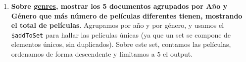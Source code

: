 \documentclass[a4paper,onecolumn]{article}
\begin{document}
\begin{sloppypar}
\begin{enumerate}
\begin{center}
\begin{figure}[h!]
        \end{figure}
    \end{center}
    \newpage
    \item \textbf{Sobre \underline{genres}, mostrar los 5 documentos agrupados por Año y Género que más número de películas diferentes tienen, mostrando el total de películas}.
    Agrupamos por año y por género, y usamos el \texttt{\$addToSet} para hallar las películas únicas (ya que un set se compone de elementos únicos, sin duplicados). Sobre este set,
    contamos las películas, ordenamos de forma descendente y limitamos a 5 el output.
    \begin{figure}[H]
        \begin{subfigure}[b]{0.6\textwidth}
            \centering
        \end{subfigure}
        \hfill
        \begin{subfigure}[b]{0.4\textwidth}

\end{subfigure}
\end{figure}
\end{enumerate}
\end{sloppypar}
\end{document}
